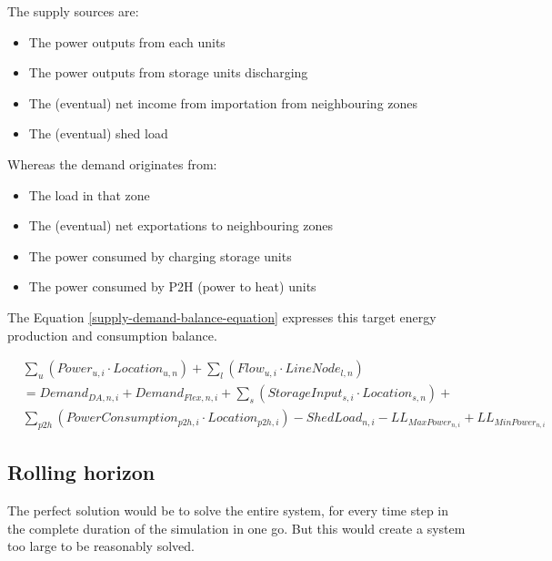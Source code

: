 The supply sources are:
\begin{itemize}
    \item The power outputs from each units 
    \item The power outputs from storage units discharging
    \item The (eventual) net income from importation from neighbouring zones
    \item The (eventual) shed load
\end{itemize}

Whereas the demand originates from:
\begin{itemize}
    \item The load in that zone
    \item The (eventual) net exportations to neighbouring zones
    \item The power consumed by charging storage units
    \item The power consumed by P2H (power to heat) units
\end{itemize}

The Equation \ref{supply-demand-balance-equation} expresses this target energy production and consumption balance.

\begin{captionnable}
    \begin{equation}
        \begin{split}
            &\sum_{u} (Power_{u,i} \cdot Location_{u,n}) + \sum_{l} (Flow_{u,i} \cdot LineNode_{l,n})\\
            & = Demand_{DA,n,i} + Demand_{Flex,n,i} + \sum_{s} (StorageInput_{s,i} \cdot Location_{s,n}) + \\
            & \sum_{p2h}(PowerConsumption_{p2h,i} \cdot Location_{p2h,i}) - ShedLoad_{n,i} - LL_{MaxPower_{n,i}} + LL_{MinPower_{n,i}} 		
        \end{split}
        \label{supply-demand-balance-equation}
    \end{equation}
\end{captionnable}

\subsection{Rolling horizon}

The perfect solution would be to solve the entire system, for every time step in the complete duration of the simulation in one go. But this would create a system too large to be reasonably solved.

